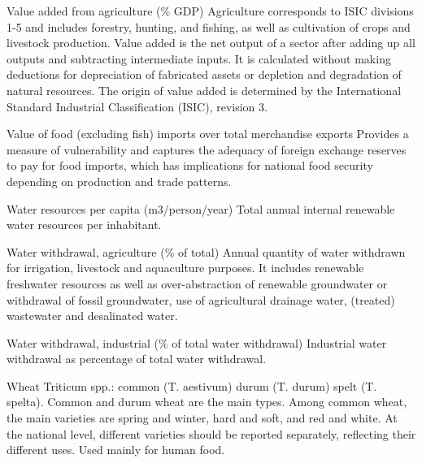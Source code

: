 \begin{MetadataCollection} {}
\begin{metadata}{Value added from agriculture (\% GDP)} {}
Agriculture corresponds to ISIC divisions 1-5 and includes forestry, hunting, and fishing, as well as cultivation of crops and livestock production. Value added is the net output of a sector after adding up all outputs and subtracting intermediate inputs. It is calculated without making deductions for depreciation of fabricated assets or depletion and degradation of natural resources. The origin of value added is determined by the International Standard Industrial Classification (ISIC), revision 3.
\end{metadata}

\begin{metadata}{Value of food (excluding fish) imports over total merchandise exports} {}
Provides a measure of vulnerability and captures the adequacy of foreign exchange reserves to pay for food imports, which has implications for national food security depending on production and trade patterns.
\end{metadata}

\begin{metadata}{Water resources per capita (m3/person/year)} {}
Total annual internal renewable water resources per inhabitant.
\end{metadata}

\begin{metadata}{Water withdrawal, agriculture (\% of total)} {}
Annual quantity of water withdrawn for irrigation, livestock and aquaculture purposes. It includes renewable freshwater resources as well as over-abstraction of renewable groundwater or withdrawal of fossil groundwater, use of agricultural drainage water, (treated) wastewater and desalinated water.
\end{metadata}

\begin{metadata}{Water withdrawal, industrial (\% of total water withdrawal)} {}
Industrial water withdrawal as percentage of total water withdrawal.
\end{metadata}

\begin{metadata}{Wheat} {}
Triticum spp.: common (T. aestivum) durum (T. durum) spelt (T. spelta). Common and durum wheat are the main types. Among common wheat, the main varieties are spring and winter, hard and soft, and red and white. At the national level, different varieties should be reported separately, reflecting their different uses. Used mainly for human food.
\end{metadata}


\end{MetadataCollection}
